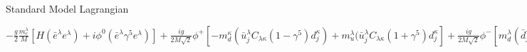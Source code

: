 \begin{frame}[fragile]
\begin{alertblock}{\small Standard Model Lagrangian}
\begin{center}
\begin{math}
-\frac{g}{2}\frac{m^{\lambda}_{e}}{M}[H(\bar{e}^{\lambda}e^{\lambda})
+i\phi^{0}(\bar{e}^{\lambda}\gamma^{5}e^{\lambda})]
+\frac{ig}{2M\sqrt{2}}\phi^{+}
[-m^{\kappa}_{d}(\bar{u}^{\lambda}_{j}C_{\lambda\kappa}(1-\gamma^{5})d^{\kappa}_{j})
+m^{\lambda}_{u}(\bar{u}^{\lambda}_{j}C_{\lambda\kappa}(1+\gamma^{5})d^{\kappa}_{j}]
+\frac{ig}{2M\sqrt{2}}\phi^{-}
[m^{\lambda}_{d}(\bar{d}^{\lambda}_{j}C^{\dagger}_{\lambda\kappa}(1+\gamma^{5})u^{\kappa}_{j})
-m^{\kappa}_{u}(\bar{d}^{\lambda}_{j}C^{\dagger}_{\lambda\kappa}(1-\gamma^{5})u^{\kappa}_{j}]
-\frac{g}{2}\frac{m^{\lambda}_{u}}{M}H(\bar{u}^{\lambda}_{j}u^{\lambda}_{j})
-\frac{g}{2}\frac{m^{\lambda}_{d}}{M}H(\bar{d}^{\lambda}_{j}d^{\lambda}_{j})
+\frac{ig}{2}\frac{m^{\lambda}_{u}}{M}\phi^{0}(\bar{u}^{\lambda}_{j}\gamma^{5}u^{\lambda}_{j})
-\frac{ig}{2}\frac{m^{\lambda}_{d}}{M}\phi^{0}(\bar{d}^{\lambda}_{j}\gamma^{5}d^{\lambda}_{j})
+\bar{X}^{+}(\partial^{2}-M^{2})X^{+}+\bar{X}^{-}(\partial^{2}-M^{2})X^{-}
+\bar{X}^{0}(\partial^{2}-\frac{M^{2}}{c^{2}_{w}})X^{0}+\bar{Y}\partial^{2}Y
+igc_{w}W^{+}_{\mu}(\partial_{\mu}\bar{X}^{0}X^{-}-\partial_{\mu}\bar{X}^{+}X^{0})
+igs_{w}W^{+}_{\mu}(\partial_{\mu}\bar{Y}X^{-}-\partial_{\mu}\bar{X}^{+}Y)
+igc_{w}W^{-}_{\mu}(\partial_{\mu}\bar{X}^{-}X^{0}-\partial_{\mu}\bar{X}^{0}X^{+})
+igs_{w}W^{-}_{\mu}(\partial_{\mu}\bar{X}^{-}Y-\partial_{\mu}\bar{Y}X^{+})
+igc_{w}Z^{0}_{\mu}(\partial_{\mu}\bar{X}^{+}X^{+}-\partial_{\mu}\bar{X}^{-}X^{-})
+igs_{w}A_{\mu}(\partial_{\mu}\bar{X}^{+}X^{+}-\partial_{\mu}\bar{X}^{-}X^{-})
-\frac{1}{2}gM[\bar{X}^{+}X^{+}H+\bar{X}^{-}X^{-}H+\frac{1}{c^{2}_{w}}\bar{X}^{0}X^{0}H]
+\frac{1-2c^{2}_{w}}{2c_{w}}igM[\bar{X}^{+}X^{0}\phi^{+}-\bar{X}^{-}X^{0}\phi^{-}]
+\frac{1}{2c_{w}}igM[\bar{X}^{0}X^{-}\phi^{+}-\bar{X}^{0}X^{+}\phi^{-}]
+igMs_{w}[\bar{X}^{0}X^{-}\phi^{+}-\bar{X}^{0}X^{+}\phi^{-}]
+\frac{1}{2}igM[\bar{X}^{+}X^{+}\phi^{0}-\bar{X}^{-}X^{-}\phi^{0}]
\end{math}
\end{center}
\end{alertblock}
\end{frame}